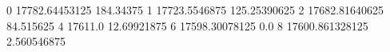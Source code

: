 0 17782.64453125 184.34375
1 17723.5546875 125.25390625
2 17682.81640625 84.515625
4 17611.0 12.69921875
6 17598.30078125 0.0
8 17600.861328125 2.560546875
